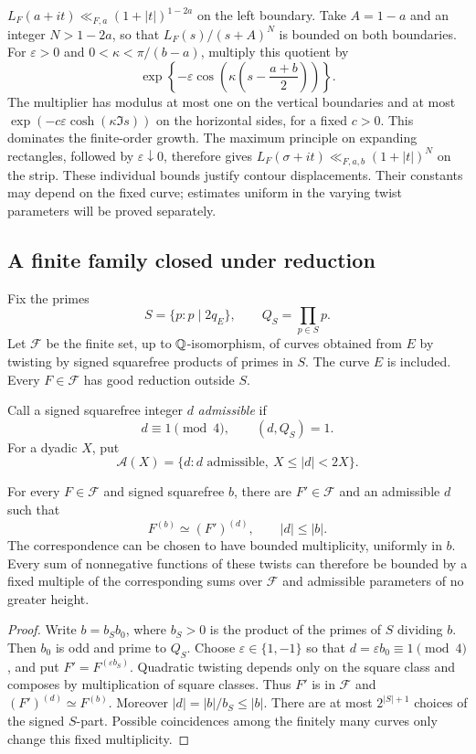 \(L_F(a+it)\ll_{F,a}(1+|t|)^{1-2a}\) on the left boundary.
Take \(A=1-a\) and an integer \(N>1-2a\), so that
\(L_F(s)/(s+A)^N\) is bounded on both boundaries. For \(\varepsilon>0\) and \(0<\kappa<\pi/(b-a)\), multiply
this quotient by
\[
 \exp\left\{-\varepsilon\cos\left(\kappa
              \left(s-\frac{a+b}{2}\right)\right)\right\}.
\]
The multiplier has modulus at most one on the vertical boundaries and
at most \(\exp(-c\varepsilon\cosh(\kappa\Im s))\) on the horizontal
sides, for a fixed \(c>0\).
This dominates the finite-order growth. The maximum principle on
expanding rectangles, followed by \(\varepsilon\downarrow0\), therefore
gives \(L_F(\sigma+it)\ll_{F,a,b}(1+|t|)^N\) on the strip.
These individual bounds justify contour displacements. Their constants
may depend on the fixed curve; estimates uniform in the varying twist
parameters will be proved separately.

\subsection{A finite family closed under reduction}

Fix the primes
\[
 S=\{p:p\mid 2q_E\},\qquad Q_S=\prod_{p\in S}p.
\]
Let \(\mathcal F\) be the finite set, up to \(\mathbb Q\)-isomorphism, of curves
obtained from \(E\) by twisting by signed squarefree products of primes
in \(S\). The curve \(E\) is included. Every \(F\in\mathcal F\) has good
reduction outside \(S\).

Call a signed squarefree integer \(d\) \emph{admissible} if
\[
 d\equiv1\pmod4,\qquad (d,Q_S)=1.
\]
For a dyadic \(X\), put
\[
 \mathcal A(X)=\{d:d\text{ admissible},\ X\le|d|<2X\}.
\]

\begin{lemma}\label{setup:reduction}
For every \(F\in\mathcal F\) and signed squarefree \(b\), there are
\(F'\in\mathcal F\) and an admissible \(d\) such that
\[
 F^{(b)}\simeq (F')^{(d)},\qquad |d|\le |b|.
\]
The correspondence can be chosen to have bounded multiplicity, uniformly
in \(b\). Every sum of nonnegative functions of these twists can
therefore be bounded by a fixed multiple of the corresponding sums over
\(\mathcal F\) and admissible parameters of no greater height.
\end{lemma}

\begin{proof}
Write \(b=b_S b_0\), where \(b_S>0\) is the product of the primes of \(S\)
dividing \(b\). Then \(b_0\) is odd and prime to \(Q_S\).
Choose \(\varepsilon\in\{1,-1\}\) so that
\(d=\varepsilon b_0\equiv1\pmod4\), and put
\(F'=F^{(\varepsilon b_S)}\).
Quadratic twisting depends only on the square class and composes by
multiplication of square classes. Thus \(F'\) is in \(\mathcal F\) and
\((F')^{(d)}\simeq F^{(b)}\).
Moreover \(|d|=|b|/b_S\le |b|\).
There are at most \(2^{|S|+1}\) choices of the signed \(S\)-part.
Possible coincidences among the finitely many curves only change this
fixed multiplicity.
\end{proof}

